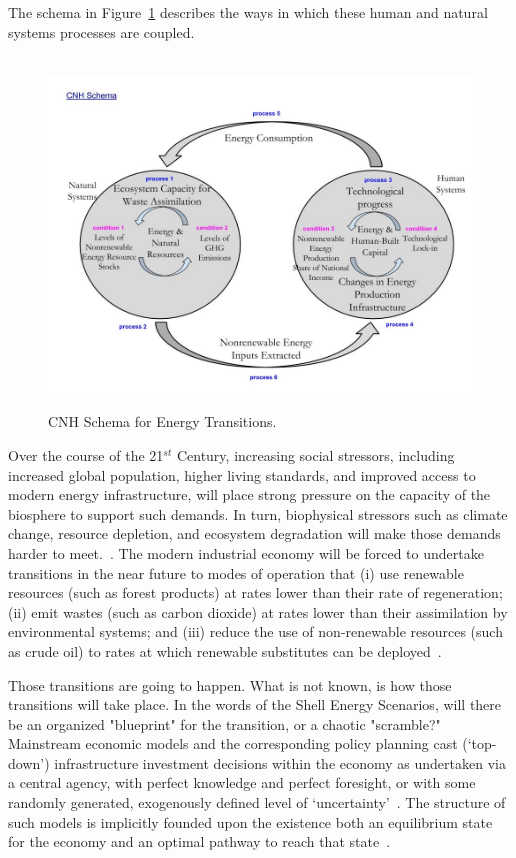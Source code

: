 \documentclass[11pt,a4paper]{article}
\begin{document}
The schema in Figure~\ref{fig:CNH_Schema} describes the ways in which 
these human and natural systems processes are coupled.
\begin{figure}
\centering\
\includegraphics[width=\linewidth]{images/CNH_Schema.jpg}
\caption[CNH Schema]{CNH Schema for Energy Transitions.}
\label{fig:CNH_Schema}
\end{figure}
Over the course of the 21$^{st}$ Century, 
increasing social stressors, including
increased global population,
 higher living standards, and
improved access to modern energy infrastructure,
will place strong pressure on the capacity of the biosphere
to support such demands. 
In turn, biophysical stressors
such as climate change,
resource depletion, and
ecosystem degradation will make those demands
harder to meet.~\cite{IPCC2014}.
The modern industrial economy will be forced to undertake
transitions in the near future
to modes of operation that
(i) use renewable resources (such as forest products) 
at rates lower than their rate of regeneration;
(ii) emit wastes (such as carbon dioxide) 
at rates lower than their assimilation by environmental systems; and
(iii) reduce the use of non-renewable resources (such as crude oil) 
to rates at which renewable substitutes can be deployed~\cite{Goodland1996, G-R1971}. 

Those transitions are going to happen. What is not known, is how
those transitions will take place. In the words of the Shell Energy Scenarios, will there be an organized "blueprint"
for the transition, or a chaotic "scramble?"~\cite{} Mainstream economic models and the corresponding
policy planning cast (`top-down') infrastructure investment decisions 
within the economy as undertaken via a central agency,
with perfect knowledge and perfect foresight, 
or with some randomly generated, 
exogenously defined level of `uncertainty'~\cite{Hu2010}.
The structure of such models
is implicitly founded upon the existence both 
an equilibrium state for the economy
and an optimal pathway to reach that state~\cite{}.
\end{document}
